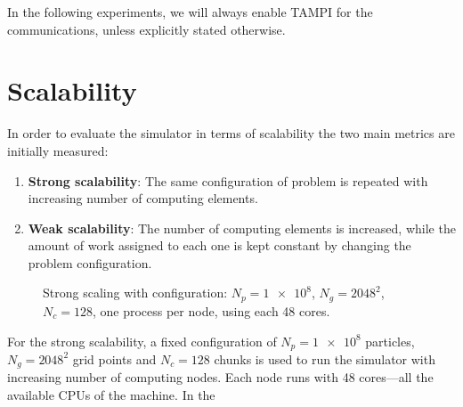 In the following experiments, we will always enable TAMPI for the 
communications, unless explicitly stated otherwise.

\section{Scalability}

In order to evaluate the simulator in terms of scalability the two main metrics 
are initially measured:
\begin{enumerate}
\item \textbf{Strong scalability}: The same configuration of problem is repeated 
with increasing number of computing elements.
\item \textbf{Weak scalability}: The number of computing elements is increased, 
while the amount of work assigned to each one is kept constant by changing the 
problem configuration.
\end{enumerate}
%
%
\begin{figure}[ht]%
\centering
{}
	\caption{Strong scaling with configuration: $N_p = \num{1e8}$, $N_g = 2048^2$,
	$N_c = 128$, one process per node, using each 48 cores.}
	\label{fig:strong-scaling}
\end{figure}%
%
For the strong scalability, a fixed configuration of $N_p = \num{1e8}$ 
particles, $N_g=2048^2$ grid points and $N_c=128$ chunks is used to run the 
simulator with increasing number of computing nodes. Each node runs with 48 
cores---all the available CPUs of the machine. In the 
